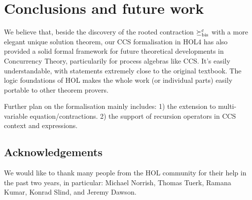 


\section{Conclusions and future work}
\label{s:concl}

We believe that, beside the discovery of the rooted contraction $\mathrel{\succeq^{\rm{c}}_{\rm{bis}}}$
with a more elegant unique solution theorem,
our CCS formalisation in HOL4 has also
provided a solid formal framework for future theoretical developments in
Concurrency Theory, particularily for process algebras like CCS. It's
easily understandable, with statements extremely close to the original
textbook. The logic foundations of HOL makes the whole work (or individual
parts) easily portable to other theorem provers.

Further plan on the formalisation mainly includes: 1) the extension to
multi-variable equation/contractions. 2) the support of recursion operators in
CCS context and expressions.
\subsection*{Acknowledgements}

We would like to thank many people from the HOL community
for their help in the past two years, in particular: 
Michael Norrish, Thomas Tuerk, 
Ramana Kumar, Konrad Slind, and Jeremy Dawson. 
